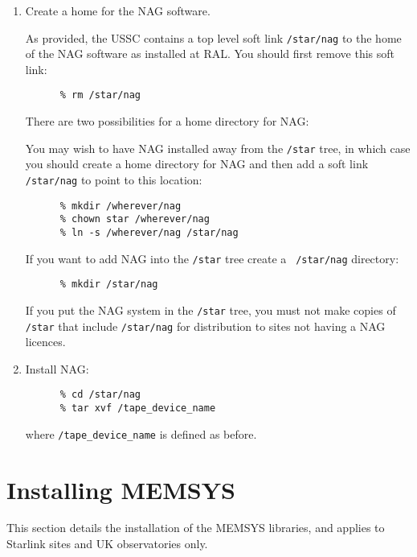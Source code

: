 \begin{enumerate}

\item Create a home for the NAG software.

As provided, the USSC contains a top level soft link {\tt /star/nag} to the
home of the NAG software as installed at RAL.  You should first remove
this soft link:

\begin{verbatim}
      % rm /star/nag
\end{verbatim}

There are two possibilities for a home directory for NAG:

You may wish to have NAG installed away from the {\tt /star} tree, in which
case you should create a home directory for NAG and then add a soft
link {\tt /star/nag} to point to this location:

\begin{verbatim}
      % mkdir /wherever/nag
      % chown star /wherever/nag
      % ln -s /wherever/nag /star/nag
\end{verbatim}

If you want to add NAG into the {\tt /star} tree create a {\tt
/star/nag} directory:

\begin{verbatim}
      % mkdir /star/nag
\end{verbatim}

If you put the NAG system in the {\tt /star} tree, you must not make copies
of {\tt /star} that include {\tt /star/nag} for distribution to sites
not having a NAG licences.

\item Install NAG:

\begin{verbatim}
      % cd /star/nag
      % tar xvf /tape_device_name
\end{verbatim}

where \verb+/tape_device_name+ is defined as before.

\end{enumerate}

\section{Installing MEMSYS}
\label{s:imemsys}

This section details the installation of the MEMSYS libraries, and
applies to Starlink sites and UK observatories only.

